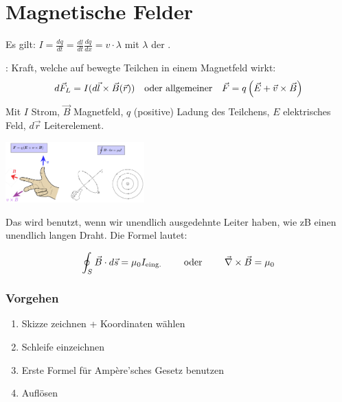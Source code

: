 \section{Magnetische Felder}

\vspace{1\baselineskip}

Es gilt: $I = \frac{dq}{dt} = \frac{dl}{dt} \frac{dq}{dx} = v \cdot \lambda$
mit $\lambda$ der .

\vspace{1\baselineskip}

: Kraft, welche auf bewegte Teilchen in einem Magnetfeld wirkt:
\begin{align*}
    d \vec{F}_L = I (d \vec{l} \times \vec{B}(\vec{r}))
    \quad \text{oder allgemeiner} \quad
    \vec{F} = q \left( \vec{E} + \vec{v} \times \vec{B} \right)
\end{align*}
Mit $I$ Strom, $\vec{B}$ Magnetfeld, $q$ (positive) Ladung des Teilchens,
$E$ elektrisches Feld, $d \vec{r}$ Leiterelement.
\begin{center}
    \includegraphics[width=0.4\textwidth]{Figures/3FingerRegel.png}
\end{center}

\vspace{1\baselineskip}

\begin{tcolorbox}
    Das  wird benutzt, wenn wir unendlich ausgedehnte Leiter haben,
    wie zB einen unendlich langen Draht. Die Formel lautet: 

    \begin{equation*}
        \oint_S \vec{B} \cdot d \vec{s} = \mu_0 I_{\mathrm{eing.}}
        \quad \quad \text{  oder  } \quad \quad
        \vec{\nabla} \times \vec{B} = \mu_0 
    \end{equation*}

    \subsubsection*{Vorgehen}

    \begin{enumerate}
        \item Skizze zeichnen + Koordinaten wählen
        \item Schleife einzeichnen
        \item Erste Formel für Ampère'sches Gesetz benutzen
        \item Auflösen
    \end{enumerate}
\end{tcolorbox}


